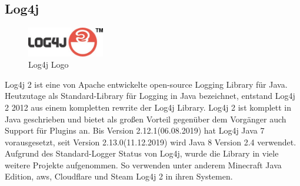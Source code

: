 
\subsection{Log4j}\label{subsec:log4j}
\begin{figure}
    \begin{center}
        \includegraphics[width=0.3\textwidth]{images/log4j}
    \end{center}
    \caption{Log4j Logo}
\end{figure}
Log4j 2 ist eine von Apache entwickelte open-source Logging Library für Java.
Heutzutage als Standard-Library für Logging in Java bezeichnet, entstand Log4j 2 2012 aus einem kompletten rewrite der Log4j Library.
Log4j 2 ist komplett in Java geschrieben und bietet als großen Vorteil gegenüber dem Vorgänger auch Support für Plugins an.
Bis Version 2.12.1(06.08.2019) hat Log4j Java 7 vorausgesetzt, seit Version 2.13.0(11.12.2019) wird Java 8 Version 2.4 verwendet.
Aufgrund des Standard-Logger Status von Log4j, wurde die Library in viele weitere Projekte aufgenommen.
So verwenden unter anderem Minecraft Java Edition, \gls{aws}, Cloudflare und Steam Log4j 2 in ihren Systemen.
